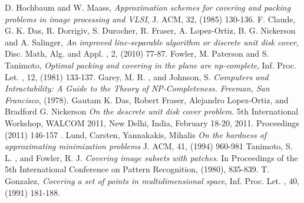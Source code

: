 \documentclass[10pt,a4wide]{report}
\theoremstyle{plain}
\theoremstyle{definition}
\theoremstyle{remark}
\begin{document}
\clearpage

\begin{thebibliography}{10} 

D. Hochbaum and W. Maass, \textit{Approximation schemes for covering and packing problems in image processing and VLSI}, 
         J. ACM, 32, (1985) 130-136.
F. Claude, G. K. Das, R. Dorrigiv, S. Durocher, R. Fraser, A. Lopez-Ortiz, B. G. Nickerson and A. Salinger, 
                 \textit{An improved line-separable algorithm or discrete unit disk cover}, Disc. Math, Alg. and Appl. , 2, (2010) 77-87.
Fowler, M. Paterson and S. Tanimoto, \textit{Optimal packing and covering in the plane are np-complete}, Inf. Proc. 
               Let. , 12, (1981) 133-137.
Garey, M. R. , and Johnson, S. \textit{Computers and Intractability: A Guide to the Theory of NP-Completeness. Freeman, San Francisco}, (1978).
 Gautam K. Das, Robert Fraser, Alejandro Lopez-Ortiz, and Bradford G. Nickerson 
                \textit{On the descrete unit disk cover problem}. 5th International Workshop, WALCOM 2011, New Delhi, India, February 18-20, 2011. Proceedings
                 (2011) 146-157 .
 Lund, Carsten, Yannakakis, Mihalis \textit{On the hardness of approximating minimization problems} J. ACM, 
41, (1994) 960-981
 Tanimoto, S. L. , and Fowler, R. J. \textit{Covering image subsets with patches}. In Proceedings of the 5th International 
               Conference on Pattern Recognition, (1980), 835-839.
T. Gonzalez, \textit{Covering a set of points in multidimensional space}, Inf. Proc. Let. , 40, (1991) 181-188.

\end{thebibliography}
 
\end{document}
